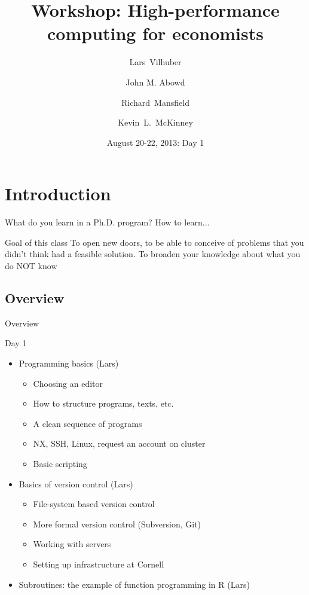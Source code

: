 \documentclass[xcolor=table,compress]{beamer}
\title[Computing for Economists]{Workshop: High-performance computing for economists}
\author[Vilhuber, Abowd, Mansfield, McKinney]{%
  Lars~Vilhuber\inst{1} \and
  John M. Abowd\inst{1} \and
  Richard~Mansfield\inst{1} \and
  Kevin~L.~McKinney %
}
\institute[Cornell]{
  \inst{1}%
   Cornell University, Economics Department,
}%
\date[August 20-22, 2013]{August 20-22, 2013: Day 1}
\begin{document}
\frame{\titlepage}

\section[Intro]{Introduction}
\begin{frame}
\begin{block}{What do you learn in a Ph.D. program?}
\pause
 How to learn...
\end{block}
\end{frame}

\begin{frame}
\begin{block}{Goal of this class}
\pause
To open new doors, to be able to conceive of problems that you didn't think had a feasible solution.\newline
\pause
To broaden your knowledge about what you do NOT know
\end{block}
\end{frame}

\subsection{Overview}
\begin{frame}{Overview}
\begin{block}{Day 1}
\begin{itemize}[<+->]
\item Programming basics (Lars)
\begin{itemize}
\item Choosing an editor
\item How to structure programs, texts, etc.
\item A clean sequence of programs
\item NX, SSH, Linux, request an account on cluster
\item Basic scripting
\end{itemize}
\item  Basics of version control (Lars)
\begin{itemize}
\item File-system based version control
\item More formal version control (Subversion, Git)
\item Working with servers
\item Setting up infrastructure at Cornell
\end{itemize}
\item Subroutines: the example of function programming in R (Lars)
\end{itemize}
\end{block}
\end{frame}
\end{document}
